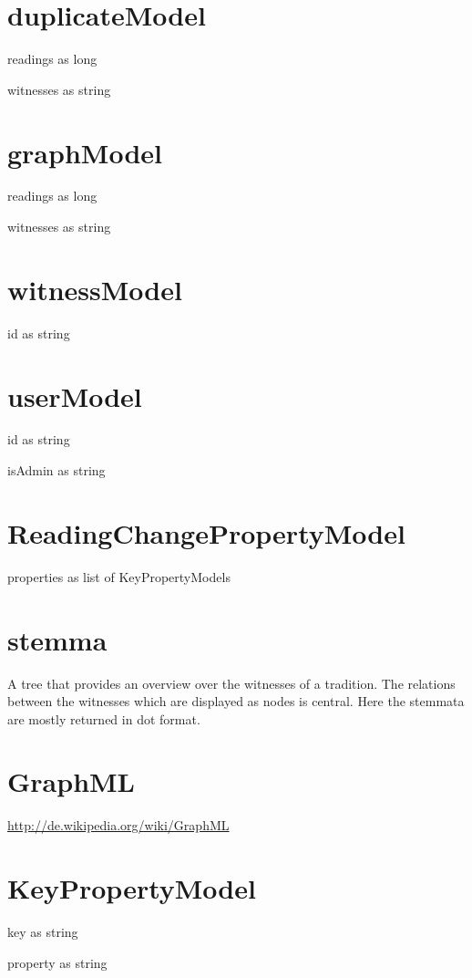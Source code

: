 \section{duplicateModel}
\begin{property}
readings as long
\end{property}
\begin{property}
witnesses as string
\end{property}
\section{graphModel}
\begin{property}
readings as long
\end{property}
\begin{property}
witnesses as string
\end{property}
\section{witnessModel}
\begin{property}
id as string
\end{property}
\section{userModel}
\begin{property}
id as string
\end{property}
\begin{property}
isAdmin as string
\end{property}
\section{ReadingChangePropertyModel}
\begin{property}
properties as list of KeyPropertyModels
\end{property}
\section{stemma}
A tree that provides an overview over the witnesses of a tradition. The relations between the witnesses which are displayed as nodes is central. Here the stemmata are mostly returned in dot format.
\section{GraphML}
\url{http://de.wikipedia.org/wiki/GraphML}
\section{KeyPropertyModel}
\begin{property}
key as string
\end{property}
\begin{property}
property as string
\end{property}
